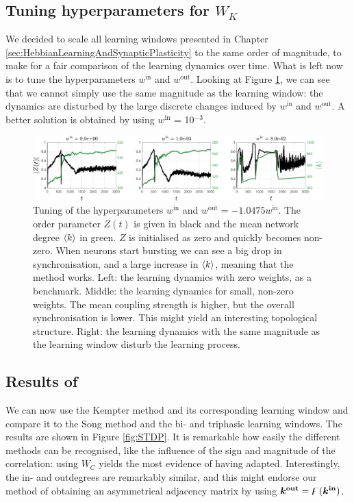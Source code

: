 \subsection{Tuning hyperparameters for \texorpdfstring{$W_K$}{TEXT}}
We decided to scale all learning windows presented in Chapter \ref{sec:HebbianLearningAndSynapticPlasticity} to the same order of magnitude, to make for a fair comparison of the learning dynamics over time. What is left now is to tune the hyperparameters $w^{\mathrm{in}}$ and $w^{\mathrm{out}}$. Looking at Figure \ref{fig:KempterWinWout}, we can see that we cannot simply use the same magnitude as the learning window: the dynamics are disturbed by the large discrete changes induced by $w^{\mathrm{in}}$ and $w^{\mathrm{out}}$. A better solution is obtained by using $w^{\mathrm{in}}$ = 10$^{-3}$.

\begin{figure}[H]
\centering
\includegraphics[width = \textwidth]{../Figures/Learning/KempterWinWout.pdf}
\caption{Tuning of the hyperparameters $w^{\mathrm{in}}$ and $w^{\mathrm{out}} = -1.0475  w^{\mathrm{in}}$. The order parameter $Z(t)$ is given in black and the mean network degree ${\langle k\rangle}$ in green. $Z$ is initialised as zero and quickly becomes non-zero. When neurons start bursting we can see a big drop in synchronisation, and a large increase in ${\langle k\rangle}$, meaning that the \STDP method works. Left: the learning dynamics with zero weights, as a benchmark. Middle: the learning dynamics for small, non-zero weights. The mean coupling strength is higher, but the overall synchronisation is lower. This might yield an interesting topological structure. Right: the learning dynamics with the same magnitude as the learning window disturb the learning process.}
\label{fig:KempterWinWout}
\end{figure}


\subsection{Results of \STDP} \label{sec:STDPlearning} %
We can now use the Kempter method and its corresponding learning window and compare it to the Song method and the bi- and triphasic learning windows. The results are shown in Figure \ref{fig:STDP}. It is remarkable how easily the different methods can be recognised, like the influence of the sign and magnitude of the correlation: using $W_C$ yields the most evidence of having adapted. Interestingly, the in- and outdegrees are remarkably similar, and this might endorse our method of obtaining an asymmetrical adjacency matrix by using $\boldsymbol{{k^{\rm out}}} = {\digamma} ( {\boldsymbol{k^{\rm in}}} )$. \\

